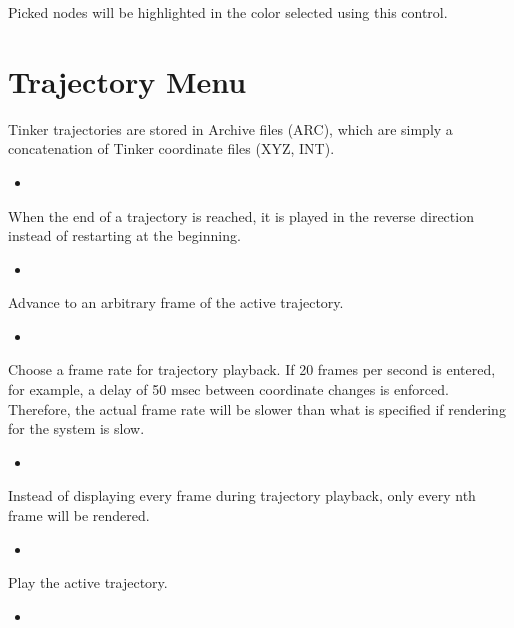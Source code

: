 \documentclass[letterpaper,11pt,english]{sphinxmanual}
\begin{document}
\sphinxAtStartPar
Picked nodes will be highlighted in the color selected using this control.


\section{Trajectory Menu}
\label{\detokenize{text/menus:trajectory-menu}}
\sphinxAtStartPar
Tinker trajectories are stored in Archive files (ARC), which are simply a concatenation of Tinker coordinate files (XYZ, INT).
\begin{itemize}
\item {} 
\sphinxAtStartPar
{}

\end{itemize}

\sphinxAtStartPar
When the end of a trajectory is reached, it is played in the reverse direction instead of restarting at the beginning.
\begin{itemize}
\item {} 
\sphinxAtStartPar
{}

\end{itemize}

\sphinxAtStartPar
Advance to an arbitrary frame of the active trajectory.
\begin{itemize}
\item {} 
\sphinxAtStartPar
{}

\end{itemize}

\sphinxAtStartPar
Choose a frame rate for trajectory playback. If 20 frames per second is entered, for example, a delay of 50 msec between coordinate changes is enforced. Therefore, the actual frame rate will be slower than what is specified if rendering for the system is slow.
\begin{itemize}
\item {} 
\sphinxAtStartPar
{}

\end{itemize}

\sphinxAtStartPar
Instead of displaying every frame during trajectory playback, only every nth frame will be rendered.
\begin{itemize}
\item {} 
\sphinxAtStartPar
{}

\end{itemize}

\sphinxAtStartPar
Play the active trajectory.
\begin{itemize}
\item {} 
\sphinxAtStartPar
{}

\end{itemize}
\end{document}
